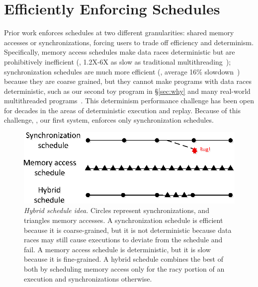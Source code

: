 \section{Efficiently Enforcing Schedules} \label{sec:peregrine}


Prior work enforces schedules at two different granularities: shared
memory accesses or synchronizations, forcing users to trade off efficiency
and determinism.  Specifically, memory access schedules make data races
deterministic but are prohibitively inefficient (\eg, 1.2X-6X as slow as
traditional multithreading~\cite{coredet:asplos10}); synchronization
schedules are much more efficient (\eg, average 16\%
slowdown~\cite{kendo:asplos09}) because they are coarse grained, but they
cannot make programs with data races deterministic, such as our second toy
program in \S\ref{sec:why} and many real-world multithreaded
programs~\cite{lu:concurrency-bugs,syncfinder:osdi10}.  This determinism
\vs performance challenge has been open for decades in the areas of
deterministic execution and replay.  Because of this challenge, 
\tern, our first \smt system, enforces only synchronization schedules.


\begin{figure}[t]
\includegraphics[width=\linewidth]{peregrine/figures/hybrid-schedule}
\vspace{-.3in}
\caption{{\em Hybrid schedule idea.} Circles represent synchronizations,
  and triangles memory accesses.  A synchronization schedule is efficient
  because it is coarse-grained, but it is not deterministic because data
  races may still cause executions to deviate from the schedule and
  fail.  A memory access schedule is
  deterministic, but it is slow because it is fine-grained.  A hybrid
  schedule combines the best of both by scheduling memory access only for
  the racy portion of an execution and synchronizations
  otherwise.} \label{fig:hybrid-schedule}
\end{figure}

